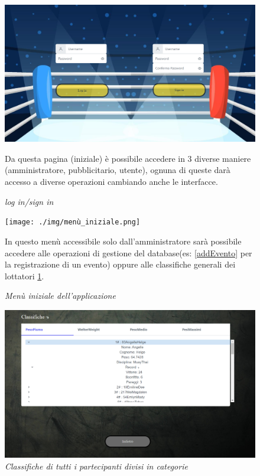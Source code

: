 \documentclass[a4paper,12pt]{report}
\begin{document}
\begin{figure}
    \centering
    \includegraphics[scale=0.4]{./img/login.png}
    \caption{\textit{log in/sign in}}
    \medskip
    Da questa pagina (iniziale) è possibile accedere in 3 diverse maniere (amministratore, pubblicitario, utente), ognuna
    di queste darà accesso a diverse operazioni cambiando anche le interfacce.
\end{figure}

\begin{figure}
    \centering
    \texttt{[image: ./img/menù\_iniziale.png]}
    \caption{\textit{Menù iniziale dell'applicazione}}
    \medskip
    In questo menù accessibile solo dall'amministratore sarà possibile accedere alle operazioni di gestione del 
    database(es: \ref{addEvento} per la registrazione di un evento) oppure alle classifiche generali dei lottatori \ref{categoria}.
\end{figure}

\begin{figure}
    \centering
    \includegraphics[scale=0.4]{./img/classifiche.png}
    \caption{\textit{Classifiche di tutti i partecipanti divisi in categorie}}
    \label{categoria}
\end{figure}
\end{document}
